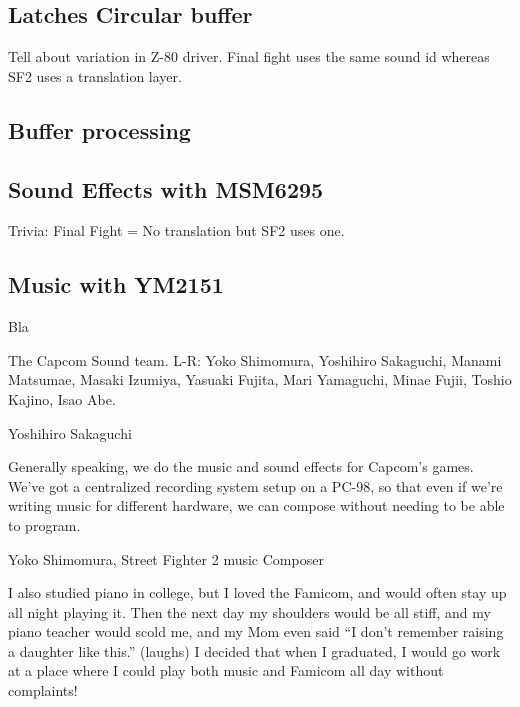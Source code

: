 \subsection{Latches Circular buffer}

Tell about variation in Z-80 driver. Final fight uses the same sound id whereas SF2 uses a translation layer.

\subsection{Buffer processing}

\subsection{Sound Effects with MSM6295}
Trivia: Final Fight = No translation but SF2 uses one.

\subsection{Music with YM2151}
Bla


The Capcom Sound team. L-R: Yoko Shimomura, Yoshihiro Sakaguchi, Manami Matsumae, Masaki Izumiya, Yasuaki Fujita, Mari Yamaguchi, Minae Fujii, Toshio Kajino, Isao Abe.

\begin{q}{Yoshihiro Sakaguchi\cite{yoko_shimomura_interview}  }

Generally speaking, we do the music and sound effects for Capcom’s games. We’ve got a centralized recording system setup on a PC-98, so that even if we’re writing music for different hardware, we can compose without needing to be able to program.
\end{q}

\begin{q}{Yoko Shimomura, Street Fighter 2 music Composer\cite{beep199010}}

I also studied piano in college, but I loved the Famicom, and would often stay up all night playing it. Then the next day my shoulders would be all stiff, and my piano teacher would scold me, and my Mom even said “I don’t remember raising a daughter like this.” (laughs) I decided that when I graduated, I would go work at a place where I could play both music and Famicom all day without complaints!
\end{q}

